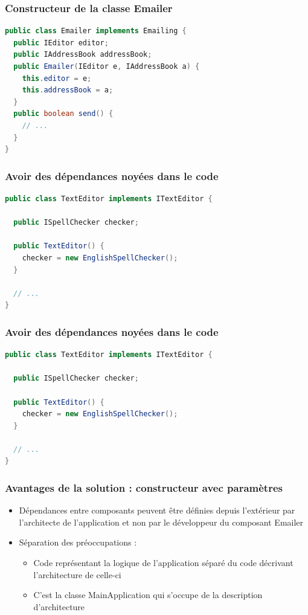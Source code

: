 \documentclass{beamer}
\begin{document}
\begin{frame}[fragile]
  \frametitle{Constructeur de la classe Emailer} 
  \begin{lstlisting}[language=Java]
public class Emailer implements Emailing {
  public IEditor editor;
  public IAddressBook addressBook;
  public Emailer(IEditor e, IAddressBook a) {
    this.editor = e;
    this.addressBook = a;
  }
  public boolean send() {
    // ...
  }
}
  \end{lstlisting}  
\end{frame}

\begin{frame}[fragile]
  \frametitle{Avoir des dépendances noyées dans le code} 
  \begin{lstlisting}[language=Java]
public class TextEditor implements ITextEditor {
      
  public ISpellChecker checker;

  public TextEditor() {
    checker = new EnglishSpellChecker();
  }

  // ...
}
  \end{lstlisting}  
\end{frame}
\begin{frame}[fragile]
  \frametitle{Avoir des dépendances noyées dans le code}
  \begin{lstlisting}[language=Java]
public class TextEditor implements ITextEditor {
      
  public ISpellChecker checker;

  public TextEditor() {
    checker = new EnglishSpellChecker();
  }

  // ...
}
  \end{lstlisting}  
\end{frame}

\begin{frame}
  \frametitle{Avantages de la solution : constructeur avec paramètres}  
  \begin{itemize}
  \item Dépendances entre composants peuvent être définies depuis
    l'extérieur par l'architecte de l'application et non par le
    développeur du composant Emailer
\item Séparation des préoccupations :
  \begin{itemize}
  \item Code représentant la logique de l'application séparé du
    code décrivant l'architecture de celle-ci

  \item C'est la classe MainApplication qui s'occupe de la description
    d'architecture
  \end{itemize}
\end{itemize}
\end{frame}
\end{document}
